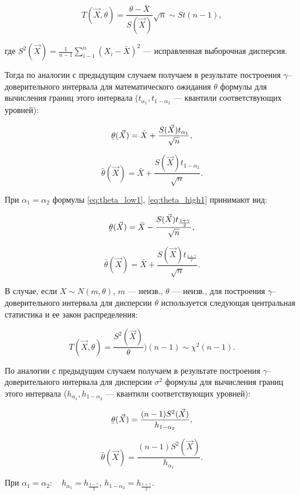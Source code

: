 \begin{equation}
	T(\vec{X}, \theta) = \frac{\theta - \bar{X}}{S(\vec{X})}\sqrt{n} \sim St(n - 1),
\end{equation}

где $S^2(\vec{X}) = \frac{1}{n - 1} \sum\limits_{i - 1}^{n} (X_i - \bar{X})^2$ --- исправленная выборочная дисперсия.

Тогда по аналогии с предыдущим случаем получаем в результате построения $\gamma$--доверительного интервала для математического ожидания $\theta$ формулы для вычисления границ этого интервала ($t_{\alpha_1}, t_{1 - \alpha_2}$ --- квантили соответствующих уровней):

\begin{equation}\label{eq:theta_low1}
	\ubar{\theta}(\vec{X}) = \bar{X} + \frac{S(\vec{X}) t_{\alpha_1}}{\sqrt{n}},
\end{equation}

\begin{equation}\label{eq:theta_high1}
	\bar{\theta}(\vec{X}) = \bar{X} + \frac{S(\vec{X}) t_{1 - \alpha_2}}{\sqrt{n}}.
\end{equation}

При $\alpha_1 = \alpha_2$ формулы \ref{eq:theta_low1}, \ref{eq:theta_high1} принимают вид:

\begin{equation}
	\ubar{\theta}(\vec{X}) = \bar{X} - \frac{S(\vec{X}) t_{ \frac{1 + \gamma}{2} } }{ \sqrt{n} },
\end{equation}

\begin{equation}
	\bar{\theta}(\vec{X}) = \bar{X} + \frac{S(\vec{X}) t_{ \frac{1 + \gamma}{2} } }{ \sqrt{n} }.
\end{equation}

В случае, если $X \sim N(m, \theta)$, $m$ --- неизв., $\theta$ --- неизв., для построения $\gamma$--доверительного интервала для дисперсии $\theta$ используется следующая центральная статистика и ее закон распределения:

\begin{equation}
	T(\vec{X}, \theta) = \frac{S^2(\vec{X})}{\theta})(n - 1) \sim \chi^2(n - 1).
\end{equation}

По аналогии с предыдущим случаем получаем в результате построения $\gamma$--доверительного интервала для дисперсии $\sigma^2$ формулы для вычисления границ этого интервала ($h_{\alpha_1}, h_{1 - \alpha_2}$ --- квантили соответствующих уровней):

\begin{equation}
	\ubar{\theta}(\vec{X}) = \frac{(n - 1) S^2(\vec{X})}{h_{1 - \alpha_2}},
\end{equation}

\begin{equation}
	\bar{\theta}(\vec{X}) = \frac{(n - 1) S^2(\vec{X})}{h_{\alpha_1}}.
\end{equation}

При $\alpha_1 = \alpha_2: \quad h_{\alpha_1} = h_{\frac{1 - \gamma}{2}}$, $h_{1 - \alpha_2} = h_{\frac{1 + \gamma}{2}}$.
